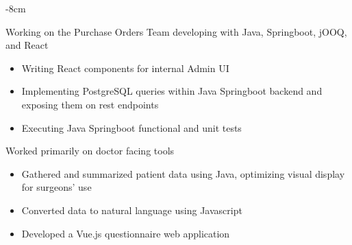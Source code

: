 \documentclass[10pt,letterpaper]{altacv}
\begin{document}
\photo{6cm}{}

\begin{adjustwidth}{}{-8cm}
\makecvheader
\end{adjustwidth}




{Working on the Purchase Orders Team developing with Java, Springboot, jOOQ, and React
\begin{itemize}
\item Writing React components for internal Admin UI
\item Implementing PostgreSQL queries within Java Springboot backend and exposing them on rest endpoints
\item Executing Java Springboot functional and unit tests
\end{itemize}}

{Worked primarily on doctor facing tools
\begin{itemize}
\item Gathered and summarized patient data using Java, optimizing visual display for surgeons’ use
\item Converted data to natural language using Javascript
\item Developed a Vue.js questionnaire web application
\end{itemize}}
\end{document}
